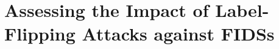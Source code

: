 \chapter{Assessing the Impact of Label-Flipping Attacks against FIDSs\label{chap:assessment}}


\providecommand{\codeurl}{}
\renewcommand{\codeurl}{\url{httos://github.com/TODO}}

\newcommand{\phantomlabel}[1]{%
  \refstepcounter{subfigure}%
  \label{#1}%
}
\newcommand{\phantomlabels}[2]{%
  \foreach \i in {a,...,#2} {%
    \expandafter\phantomlabel{#1.\i}%
  }%
}





